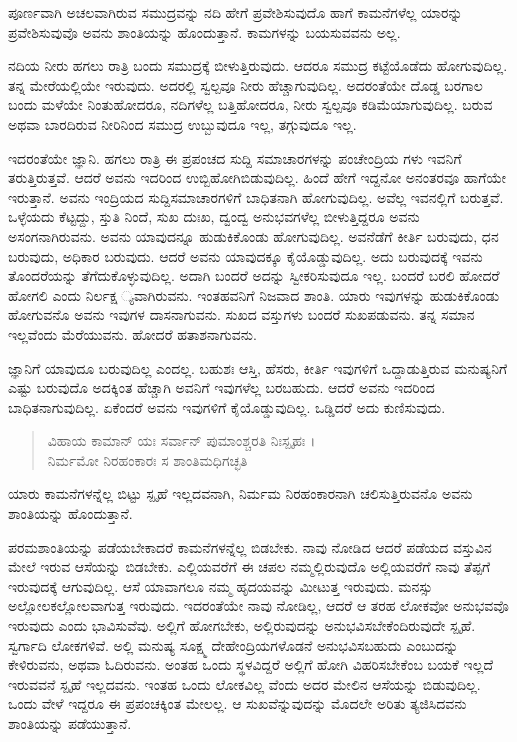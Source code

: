 {\small ಪೂರ್ಣವಾಗಿ ಅಚಲವಾಗಿರುವ ಸಮುದ್ರವನ್ನು ನದಿ ಹೇಗೆ ಪ್ರವೇಶಿಸುವುದೊ ಹಾಗೆ ಕಾಮನೆಗಳೆಲ್ಲ ಯಾರನ್ನು ಪ್ರವೇಶಿಸುವುವೊ ಅವನು ಶಾಂತಿಯನ್ನು ಹೊಂದುತ್ತಾನೆ. ಕಾಮಗಳನ್ನು ಬಯಸುವವನು ಅಲ್ಲ.}

ನದಿಯ ನೀರು ಹಗಲು ರಾತ್ರಿ ಬಂದು ಸಮುದ್ರಕ್ಕೆ ಬೀಳುತ್ತಿರುವುದು. ಆದರೂ ಸಮುದ್ರ ಕಟ್ಟೆಯೊಡೆದು ಹೋಗುವುದಿಲ್ಲ. ತನ್ನ ಮೇರೆಯಲ್ಲಿಯೇ ಇರುವುದು. ಅದರಲ್ಲಿ ಸ್ವಲ್ಪವೂ ನೀರು ಹೆಚ್ಚಾಗುವುದಿಲ್ಲ. ಅದರಂತೆಯೇ ದೊಡ್ಡ ಬರಗಾಲ ಬಂದು ಮಳೆಯೇ ನಿಂತುಹೋದರೂ, ನದಿಗಳೆಲ್ಲ ಬತ್ತಿಹೋದರೂ, ನೀರು ಸ್ವಲ್ಪವೂ ಕಡಿಮೆಯಾಗುವುದಿಲ್ಲ. ಬರುವ ಅಥವಾ ಬಾರದಿರುವ ನೀರಿನಿಂದ ಸಮುದ್ರ ಉಬ್ಬುವುದೂ ಇಲ್ಲ, ತಗ್ಗುವುದೂ ಇಲ್ಲ.

ಇದರಂತೆಯೇ ಜ್ಞಾನಿ. ಹಗಲು ರಾತ್ರಿ ಈ ಪ್ರಪಂಚದ ಸುದ್ದಿ ಸಮಾಚಾರಗಳನ್ನು ಪಂಚೇಂದ್ರಿಯ ಗಳು ಇವನಿಗೆ ತರುತ್ತಿರುತ್ತವೆ. ಆದರೆ ಅವನು ಇದರಿಂದ ಉಬ್ಬಿಹೋಗಿಬಿಡುವುದಿಲ್ಲ. ಹಿಂದೆ ಹೇಗೆ ಇದ್ದನೋ ಅನಂತರವೂ ಹಾಗೆಯೇ ಇರುತ್ತಾನೆ. ಅವನು ಇಂದ್ರಿಯದ ಸುದ್ದಿಸಮಾಚಾರಗಳಿಗೆ ಬಾಧಿತನಾಗಿ ಹೋಗುವುದಿಲ್ಲ. ಅವೆಲ್ಲ ಇವನಲ್ಲಿಗೆ ಬರುತ್ತವೆ. ಒಳ್ಳೆಯದು ಕೆಟ್ಟದ್ದು, ಸ್ತುತಿ ನಿಂದೆ, ಸುಖ ದುಃಖ, ದ್ವಂದ್ವ ಅನುಭವಗಳೆಲ್ಲ ಬೀಳುತ್ತಿದ್ದರೂ ಅವನು ಅಸಂಗನಾಗಿರುವನು. ಅವನು ಯಾವುದನ್ನೂ ಹುಡುಕಿಕೊಂಡು ಹೋಗುವುದಿಲ್ಲ. ಅವನೆಡೆಗೆ ಕೀರ್ತಿ ಬರುವುದು, ಧನ ಬರುವುದು, ಅಧಿಕಾರ ಬರುವುದು. ಆದರೆ ಅವನು ಯಾವುದಕ್ಕೂ ಕೈಯೊಡ್ಡುವುದಿಲ್ಲ. ಅದು ಬರುವುದಕ್ಕೆ ಇವನು ತೊಂದರೆಯನ್ನು ತೆಗೆದುಕೊಳ್ಳುವುದಿಲ್ಲ. ಅದಾಗಿ ಬಂದರೆ ಅದನ್ನು ಸ್ವೀಕರಿಸುವುದೂ ಇಲ್ಲ. ಬಂದರೆ ಬರಲಿ ಹೋದರೆ ಹೋಗಲಿ ಎಂದು ನಿರ್ಲಕ್ಷ ್ಯವಾಗಿರುವನು. ಇಂತಹವನಿಗೆ ನಿಜವಾದ ಶಾಂತಿ. ಯಾರು ಇವುಗಳನ್ನು ಹುಡುಕಿಕೊಂಡು ಹೋಗುವನೊ ಅವನು ಇವುಗಳ ದಾಸನಾಗುವನು. ಸುಖದ ವಸ್ತುಗಳು ಬಂದರೆ ಸುಖಪಡುವನು. ತನ್ನ ಸಮಾನ ಇಲ್ಲವೆಂದು ಮೆರೆಯುವನು. ಹೋದರೆ ಹತಾಶನಾಗುವನು.

ಜ್ಞಾನಿಗೆ ಯಾವುದೂ ಬರುವುದಿಲ್ಲ ಎಂದಲ್ಲ. ಬಹುಶಃ ಆಸ್ತಿ, ಹೆಸರು, ಕೀರ್ತಿ ಇವುಗಳಿಗೆ ಒದ್ದಾಡುತ್ತಿರುವ ಮನುಷ್ಯನಿಗೆ ಎಷ್ಟು ಬರುವುದೊ ಅದಕ್ಕಿಂತ ಹೆಚ್ಚಾಗಿ ಅವನಿಗೆ ಇವುಗಳೆಲ್ಲ ಬರಬಹುದು. ಆದರೆ ಅವನು ಇದರಿಂದ ಬಾಧಿತನಾಗುವುದಿಲ್ಲ. ಏಕೆಂದರೆ ಅವನು ಇವುಗಳಿಗೆ ಕೈಯೊಡ್ಡುವುದಿಲ್ಲ. ಒಡ್ಡಿದರೆ ಅದು ಕುಣಿಸುವುದು.

\begin{verse}
ವಿಹಾಯ ಕಾಮಾನ್ ಯಃ ಸರ್ವಾನ್ ಪುಮಾಂಶ್ಚರತಿ ನಿಃಸ್ಪೃಹಃ ।\\ನಿರ್ಮಮೋ ನಿರಹಂಕಾರಃ ಸ ಶಾಂತಿಮಧಿಗಚ್ಛತಿ 
\end{verse}

{\small ಯಾರು ಕಾಮನೆಗಳನ್ನೆಲ್ಲ ಬಿಟ್ಟು ಸ್ಪೃಹೆ ಇಲ್ಲದವನಾಗಿ, ನಿರ್ಮಮ ನಿರಹಂಕಾರನಾಗಿ ಚಲಿಸುತ್ತಿರುವನೊ ಅವನು ಶಾಂತಿಯನ್ನು ಹೊಂದುತ್ತಾನೆ.}

ಪರಮಶಾಂತಿಯನ್ನು ಪಡೆಯಬೇಕಾದರೆ ಕಾಮನೆಗಳನ್ನೆಲ್ಲ ಬಿಡಬೇಕು. ನಾವು ನೋಡಿದ ಆದರೆ ಪಡೆಯದ ವಸ್ತುವಿನ ಮೇಲೆ ಇರುವ ಆಸೆಯನ್ನು ಬಿಡಬೇಕು. ಎಲ್ಲಿಯವರೆಗೆ ಈ ಚಪಲ ನಮ್ಮಲ್ಲಿರುವುದೊ ಅಲ್ಲಿಯವರೆಗೆ ನಾವು ತೆಪ್ಪಗೆ ಇರುವುದಕ್ಕೆ ಆಗುವುದಿಲ್ಲ. ಆಸೆ ಯಾವಾಗಲೂ ನಮ್ಮ ಹೃದಯವನ್ನು ಮೀಟುತ್ತ ಇರುವುದು. ಮನಸ್ಸು ಅಲ್ಲೋಲಕಲ್ಲೋಲವಾಗುತ್ತ ಇರುವುದು. ಇದರಂತೆಯೇ ನಾವು ನೋಡಿಲ್ಲ, ಆದರೆ ಆ ತರಹ ಲೋಕವೋ ಅನುಭವವೊ ಇರುವುದು ಎಂದು ಭಾವಿಸುವೆವು. ಅಲ್ಲಿಗೆ ಹೋಗಬೇಕು, ಅಲ್ಲಿರುವುದನ್ನು ಅನುಭವಿಸಬೇಕೆಂದಿರುವುದೇ ಸ್ಪೃಹೆ. ಸ್ವರ್ಗಾದಿ ಲೋಕಗಳಿವೆ. ಅಲ್ಲಿ ಮನುಷ್ಯ ಸೂಕ್ಷ್ಮ ದೇಹೇಂದ್ರಿಯಗಳೊಡನೆ ಅನುಭವಿಸಬಹುದು ಎಂಬುದನ್ನು ಕೇಳಿರುವನು, ಅಥವಾ ಓದಿರುವನು. ಅಂತಹ ಒಂದು ಸ್ಥಳವಿದ್ದರೆ ಅಲ್ಲಿಗೆ ಹೋಗಿ ವಿಹರಿಸಬೇಕೆಂಬ ಬಯಕೆ ಇಲ್ಲದೆ ಇರುವವನೆ ಸ್ಪೃಹೆ ಇಲ್ಲದವನು. ಇಂತಹ ಒಂದು ಲೋಕವಿಲ್ಲ ವೆಂದು ಅದರ ಮೇಲಿನ ಆಸೆಯನ್ನು ಬಿಡುವುದಿಲ್ಲ. ಒಂದು ವೇಳೆ ಇದ್ದರೂ ಈ ಪ್ರಪಂಚಕ್ಕಿಂತ ಮೇಲಲ್ಲ. ಆ ಸುಖವೆನ್ನುವುದನ್ನು ಮೊದಲೇ ಅರಿತು ತ್ಯಜಿಸಿದವನು ಶಾಂತಿಯನ್ನು ಪಡೆಯುತ್ತಾನೆ.

